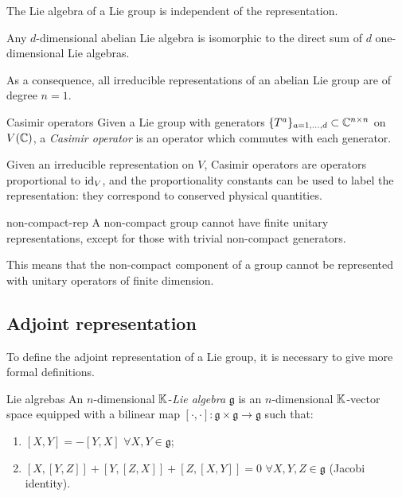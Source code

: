 \begin{proposition}{}{}
  The Lie algebra of a Lie group is independent of the representation.
\end{proposition}

\begin{proposition}{}{}
  Any $ d $-dimensional abelian Lie algebra is isomorphic to the direct sum of $ d $ one-dimensional Lie algebras.
\end{proposition}

As a consequence, all irreducible representations of an abelian Lie group are of degree $ n = 1 $.

\begin{definition}{Casimir operators}{}
  Given a Lie group with generators $ \{T^a\}_{a = 1, \dots, d} \subset \mathbb{C}^{n \times n} $ on $ V(\mathbb{C}) $, a \textit{Casimir operator} is an operator which commutes with each generator.
\end{definition}

Given an irreducible representation on $ V $, Casimir operators are operators proportional to $ \operatorname{id}_V $, and the proportionality constants can be used to label the representation: they correspond to conserved physical quantities.

\begin{proposition}{}{non-compact-rep}
  A non-compact group cannot have finite unitary representations, except for those with trivial non-compact generators.
\end{proposition}

This means that the non-compact component of a group cannot be represented with unitary operators of finite dimension.

\subsection{Adjoint representation}

To define the adjoint representation of a Lie group, it is necessary to give more formal definitions.

\begin{definition}{Lie algrebas}{}
  An $ n $-dimensional $ \mathbb{K} $-\textit{Lie algebra} $ \mathfrak{g} $ is an $ n $-dimensional $ \mathbb{K} $-vector space equipped with a bilinear map $ [\cdot,\cdot] : \mathfrak{g} \times \mathfrak{g} \rightarrow \mathfrak{g} $ such that:
  \begin{enumerate}
    \item $ [X,Y] = - [Y,X] \,\,\forall X,Y \in \mathfrak{g} $;
    \item $ [X,[Y,Z]] + [Y,[Z,X]] + [Z,[X,Y]] = 0 \,\,\forall X,Y,Z \in \mathfrak{g} $ (Jacobi identity).
  \end{enumerate}
\end{definition}

